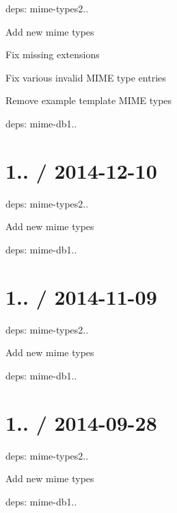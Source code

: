 \begin{DoxyItemize}
\item deps\+: mime-\/types2..
\begin{DoxyItemize}
\item Add new mime types
\item Fix missing extensions
\item Fix various invalid M\+I\+M\+E type entries
\item Remove example template M\+I\+M\+E types
\item deps\+: mime-\/db1..
\end{DoxyItemize}
\end{DoxyItemize}

\section*{1.. / 2014-\/12-\/10 }


\begin{DoxyItemize}
\item deps\+: mime-\/types2..
\begin{DoxyItemize}
\item Add new mime types
\item deps\+: mime-\/db1..
\end{DoxyItemize}
\end{DoxyItemize}

\section*{1.. / 2014-\/11-\/09 }


\begin{DoxyItemize}
\item deps\+: mime-\/types2..
\begin{DoxyItemize}
\item Add new mime types
\item deps\+: mime-\/db1..
\end{DoxyItemize}
\end{DoxyItemize}

\section*{1.. / 2014-\/09-\/28 }


\begin{DoxyItemize}
\item deps\+: mime-\/types2..
\begin{DoxyItemize}
\item Add new mime types
\item deps\+: mime-\/db1..
\end{DoxyItemize}
\end{DoxyItemize}

